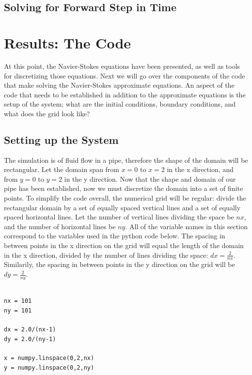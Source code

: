 \documentclass[twocolumn,12pth]{article}
\begin{document}
\subsection{Solving for Forward Step in Time}


\section{Results: The Code}

At this point, the Navier-Stokes equations have been presented, as well as tools for discretizing those equations.
Next we will go over the components of the code that make solving the Navier-Stokes approximate equations.
An aspect of the code that needs to be established in addition to the approximate equations is the setup of the system; what are the initial conditions, boundary conditions, and what does the grid look like?

\subsection{Setting up the System}

The simulation is of fluid flow in a pipe, therefore the shape of the domain will be rectangular.
Let the domain span from $x = 0$ to $x = 2$ in the x direction, and from $y = 0$ to $y = 2$ in the y direction.
Now that the shape and domain of our pipe has been established, now we must discretize the domain into a set of finite points.
To simplify the code overall, the numerical grid will be regular: divide the rectangular domain by a set of equally spaced vertical lines and a set of equally spaced horizontal lines.
Let the number of vertical lines dividing the space be $nx$, and the number of horizontal lines be $ny$.
All of the variable names in this section correspond to the variables used in the python code below.
The spacing in between points in the x direction on the grid will equal the length of the domain in the x direction, divided by the number of lines dividing the space: $dx = \frac{2}{nx}$.
Similarily, the spacing in between points in the y direction on the grid will be $dy = \frac{2}{ny}$. 

\begin{lstlisting}

nx = 101
ny = 101

dx = 2.0/(nx-1)
dy = 2.0/(ny-1)

x = numpy.linspace(0,2,nx)
y = numpy.linspace(0,2,ny)

\end{lstlisting}
\end{document}
